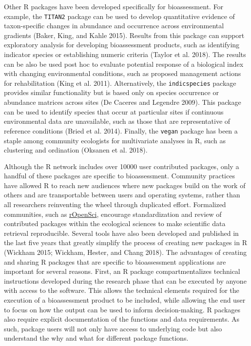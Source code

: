 \documentclass[fleqn,10pt,lineno]{wlpeerj} %
\begin{document}
Other R packages have been developed specifically for bioassessment. For example, the \texttt{TITAN2} package can be used to develop quantitative evidence of taxon-specific changes in abundance and occurrence across environmental gradients (Baker, King, and Kahle 2015). Results from this package can support exploratory analysis for developing bioassessment products, such as identifying indicator species or establishing numeric criteria (Taylor et al. 2018). The results can be also be used post hoc to evaluate potential response of a biological index with changing environmental conditions, such as proposed management actions for rehabilitation (King et al. 2011). Alternatively, the \texttt{indicspecies} package provides similar functionality but is based only on species occurrence or abundance matrices across sites (De Caceres and Legendre 2009). This package can be used to identify species that occur at particular sites if continuous environmental data are unavailable, such as those that are representative of reference conditions (Bried et al. 2014). Finally, the \texttt{vegan} package has been a staple among community ecologists for multivariate analyses in R, such as clustering and ordination (Oksanen et al. 2018).

Although the R network includes over 10000 user contributed packages, only a handful of these packages are specific to bioassessment. Community practices have allowed R to reach new audiences where new packages build on the work of others and are transportable between users and operating systems, rather than all researchers reinventing the wheel through duplicated effort. Formalized communities, such as \href{https://ropensci.org/}{rOpenSci}, encourage standardization and review of contributed packages within the ecological sciences to make scientific data retrieval reproducible. Several tools have also been developed and published in the last five years that greatly simplify the process of creating new packages in R (Wickham 2015; Wickham, Hester, and Chang 2018). The advantages of creating and sharing R packages that are specific to bioassessment applications are important for several reasons. First, an R package compartmentalizes technical instructions developed during the research phase that can be executed by anyone with access to the software. This allows the technical elements required for the execution of a bioassessment product to be included, while allowing the end user to focus on how the output can be used to inform decision-making. R packages also require explicit documentation of the functions and data requirements. As such, package users will not only have access to underlying code but also understand the why and what for different package functions.
\end{document}

